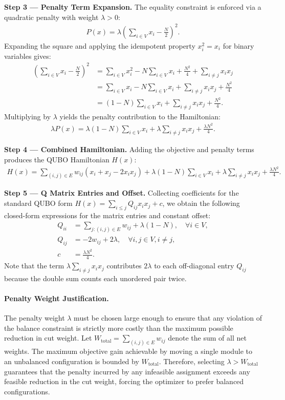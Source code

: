 \documentclass[12pt]{article}
\begin{document}
\textbf{Step 3 --- Penalty Term Expansion.} The equality constraint is enforced via a quadratic penalty with weight $\lambda > 0$:
\begin{align}
P(x) = \lambda \left( \sum_{i \in V} x_i - \frac{N}{2} \right)^2.
\end{align}
Expanding the square and applying the idempotent property $x_i^2 = x_i$ for binary variables gives:
\begin{align}
\left( \sum_{i \in V} x_i - \frac{N}{2} \right)^2 &= \sum_{i \in V} x_i^2 - N \sum_{i \in V} x_i + \frac{N^2}{4} + \sum_{i \neq j} x_i x_j \\
&= \sum_{i \in V} x_i - N \sum_{i \in V} x_i + \sum_{i \neq j} x_i x_j + \frac{N^2}{4} \\
&= (1 - N) \sum_{i \in V} x_i + \sum_{i \neq j} x_i x_j + \frac{N^2}{4}.
\end{align}
Multiplying by $\lambda$ yields the penalty contribution to the Hamiltonian:
\begin{align}
\lambda P(x) = \lambda(1 - N) \sum_{i \in V} x_i + \lambda \sum_{i \neq j} x_i x_j + \frac{\lambda N^2}{4}.
\end{align}

\textbf{Step 4 --- Combined Hamiltonian.} Adding the objective and penalty terms produces the QUBO Hamiltonian $H(x)$:
\begin{align}
H(x) = \sum_{(i,j) \in E} w_{ij} (x_i + x_j - 2x_i x_j) + \lambda(1 - N) \sum_{i \in V} x_i + \lambda \sum_{i \neq j} x_i x_j + \frac{\lambda N^2}{4}.
\end{align}

\textbf{Step 5 --- Q Matrix Entries and Offset.} Collecting coefficients for the standard QUBO form $H(x) = \sum_{i \leq j} Q_{ij} x_i x_j + c$, we obtain the following closed-form expressions for the matrix entries and constant offset:
\begin{align}
Q_{ii} &= \sum_{j : (i,j) \in E} w_{ij} + \lambda(1 - N), \quad \forall i \in V, \\
Q_{ij} &= -2w_{ij} + 2\lambda, \quad \forall i, j \in V, i \neq j, \\
c &= \frac{\lambda N^2}{4}.
\end{align}
Note that the term $\lambda \sum_{i \neq j} x_i x_j$ contributes $2\lambda$ to each off-diagonal entry $Q_{ij}$ because the double sum counts each unordered pair twice.

\paragraph{Penalty Weight Justification.}
The penalty weight $\lambda$ must be chosen large enough to ensure that any violation of the balance constraint is strictly more costly than the maximum possible reduction in cut weight. Let $W_{\text{total}} = \sum_{(i,j) \in E} w_{ij}$ denote the sum of all net weights. The maximum objective gain achievable by moving a single module to an unbalanced configuration is bounded by $W_{\text{total}}$. Therefore, selecting $\lambda > W_{\text{total}}$ guarantees that the penalty incurred by any infeasible assignment exceeds any feasible reduction in the cut weight, forcing the optimizer to prefer balanced configurations.
\end{document}

